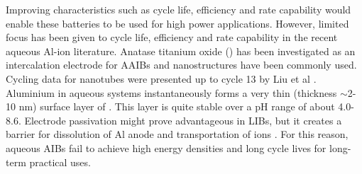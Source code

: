 Improving characteristics such as cycle life, efficiency and rate capability would enable these batteries to be used for high power applications. However, limited focus has been given to cycle life, efficiency and rate capability in the recent aqueous Al-ion literature. Anatase titanium oxide () has been investigated as an intercalation electrode for AAIBs and  nanostructures have been commonly used. Cycling data for  nanotubes were presented up to cycle 13 by Liu et al \cite{liu_aluminum_2012}.  %
Aluminium in aqueous systems instantaneously forms a very thin (thickness $\sim$2-10 nm) surface layer of  \cite{vargel_corrosion_2008}. This layer is quite stable over a pH range of about 4.0-8.6. Electrode passivation might prove advantageous in LIBs, but it creates a barrier for dissolution of Al anode and transportation of  ions \cite{myung_electrochemical_2011}. For this reason, aqueous AIBs fail to achieve high energy densities and long cycle lives for long-term practical uses.


